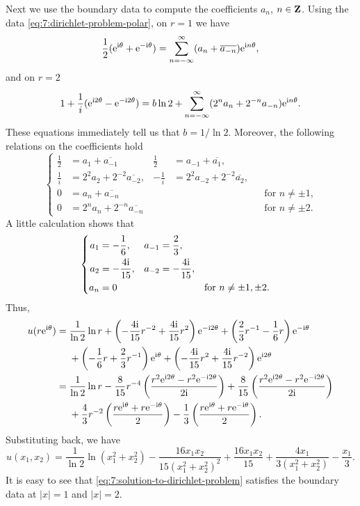 \begin{solution*}
  Next we use the boundary data to compute the coefficients \(a_n\),
  \(n\in\mathbf{Z}\). Using the data \eqref{eq:7:dirichlet-problem-polar}, on
  \(r=1\) we have
  \[
    \frac{1}{2}(\rme^{\rmi\theta}+\rme^{-\rmi\theta})%
    =\sum_{n=-\infty}^\infty (a_n+\overline{a_{-n}})\rme^{\rmi n\theta},
  \]
  and on \(r=2\)
  \[
    1+\frac{1}{i}(\mathrm{e}^{\mathrm{i} 2\theta}-\mathrm{e}^{-\mathrm{i} 2\theta}) = b\ln
    2+\sum_{n=-\infty}^\infty (2^na_n+2^{-n}a_{-n})\mathrm{e}^{\mathrm{i} n\theta}.
  \]
  These equations immediately tell us that \(b=1/{\ln 2}\). Moreover, the
  following relations on the coefficients hold
  \[
    \left\{
    \begin{aligned}
      \frac{1}{2}&=a_1+\overline{a_{-1}}
      &\frac{1}{2}&=a_{-1}+\overline{a_1},\\
      \frac{1}{i}&=2^2a_2+2^{-2}\overline{a_{-2}},
      &-\frac{1}{i}&=2^2a_{-2}+2^{-2}\overline{a_{2}},\\
      0&=a_n+\overline{a_{-n}}&&&&\text{for \(n\neq\pm 1\),}\\
      0&=2^{n}a_n+2^{-n}\overline{a_{-n}}&&&&\text{for \(n\neq\pm 2\).}
    \end{aligned}
    \right.
  \]
  A little calculation shows that
  \[
    \left\{
      \begin{aligned}
        a_1&=-\frac{1}{6},&a_{-1}&=\frac{2}{3},\\
        a_2&=-\frac{4\mathrm{i}}{15},&a_{-2}&=-\frac{4\mathrm{i}}{15},\\
        a_n&=0&&&&\text{for \(n\neq \pm 1,\pm 2\).}
      \end{aligned}
    \right.
  \]
  Thus,
  \[
    \begin{aligned}
      u(r\rme^{\rmi\theta})
      &=\frac{1}{\ln 2}\ln r
      +\left(-\frac{4\rmi}{15}r^{-2}+\frac{4\rmi}{15}r^2\right)\rme^{-\rmi
        2\theta} +\left(\frac{2}{3}r^{-1}-\frac{1}{6}r\right)\rme^{-\rmi\theta}\\
      &\phantom{{}={}}
      +\left(-\frac{1}{6}r+\frac{2}{3}r^{-1}\right)\rme^{\rmi\theta}
      +\left(-\frac{4\rmi}{15}r^2+\frac{4\rmi}{15}r^{-2}\right)\rme^{\rmi
        2\theta}\\
      &=\frac{1}{\ln 2}\ln r-\frac{8}{15}r^{-4}
      \left(\frac{r^2\rme^{\rmi 2\theta}-r^2\rme^{-\rmi 2\theta}}{2\rmi}\right)
      +\frac{8}{15}
      \left(\frac{r^2\rme^{\rmi 2\theta}-r^2\rme^{-\rmi
            2\theta}}{2\rmi}\right)\\
      &\phantom{{}={}}
      +\frac{4}{3}r^{-2}
      \left(\frac{r\rme^{\rmi\theta}+r\rme^{-\rmi\theta}}{2}\right)
      -\frac{1}{3}
      \left(\frac{r\rme^{\rmi\theta}+r\rme^{-\rmi\theta}}{2}\right).
    \end{aligned}
  \]
  Substituting back, we have
  \begin{equation}
    \label{eq:7:solution-to-dirichlet-problem}
    u(x_1,x_2)=\frac{1}{\ln 2}\ln(x_1^2+x_2^2)
    -\frac{16x_1x_2}{15{(x_1^2+x_2^2)}^2}+\frac{16x_1x_2}{15}
    +\frac{4x_1}{3(x_1^2+x_2^2)}-\frac{x_1}{3}.
  \end{equation}
  It is easy to see that \eqref{eq:7:solution-to-dirichlet-problem}
  satisfies the boundary data at \(|x|=1\) and \(|x|=2\).
\end{solution*}

